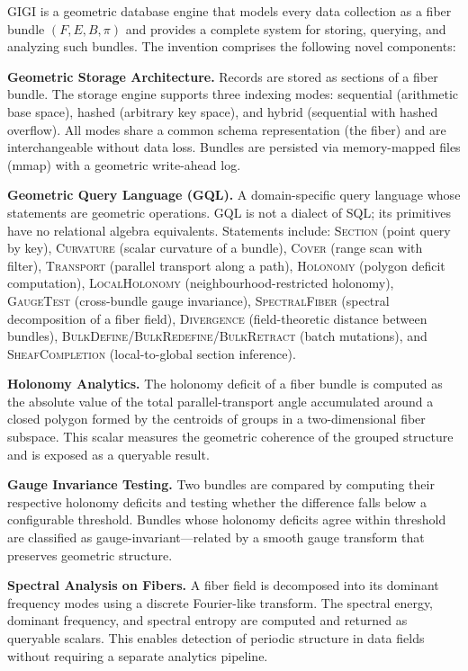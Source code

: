 \documentclass[11pt,letterpaper]{article}
\begin{document}
GIGI is a geometric database engine that models every data collection as a fiber bundle $(F, E, B, \pi)$ and provides a complete system for storing, querying, and analyzing such bundles. The invention comprises the following novel components:

\textbf{Geometric Storage Architecture.} Records are stored as sections of a fiber bundle. The storage engine supports three indexing modes: sequential (arithmetic base space), hashed (arbitrary key space), and hybrid (sequential with hashed overflow). All modes share a common schema representation (the fiber) and are interchangeable without data loss. Bundles are persisted via memory-mapped files (mmap) with a geometric write-ahead log.

\textbf{Geometric Query Language (GQL).} A domain-specific query language whose statements are geometric operations. GQL is not a dialect of SQL; its primitives have no relational algebra equivalents. Statements include: \textsc{Section} (point query by key), \textsc{Curvature} (scalar curvature of a bundle), \textsc{Cover} (range scan with filter), \textsc{Transport} (parallel transport along a path), \textsc{Holonomy} (polygon deficit computation), \textsc{LocalHolonomy} (neighbourhood-restricted holonomy), \textsc{GaugeTest} (cross-bundle gauge invariance), \textsc{SpectralFiber} (spectral decomposition of a fiber field), \textsc{Divergence} (field-theoretic distance between bundles), \textsc{BulkDefine}/\allowbreak\textsc{BulkRedefine}/\allowbreak\textsc{BulkRetract} (batch mutations), and \textsc{SheafCompletion} (local-to-global section inference).

\textbf{Holonomy Analytics.} The holonomy deficit of a fiber bundle is computed as the absolute value of the total parallel-transport angle accumulated around a closed polygon formed by the centroids of groups in a two-dimensional fiber subspace. This scalar measures the geometric coherence of the grouped structure and is exposed as a queryable result.

\textbf{Gauge Invariance Testing.} Two bundles are compared by computing their respective holonomy deficits and testing whether the difference falls below a configurable threshold. Bundles whose holonomy deficits agree within threshold are classified as gauge-invariant---related by a smooth gauge transform that preserves geometric structure.

\textbf{Spectral Analysis on Fibers.} A fiber field is decomposed into its dominant frequency modes using a discrete Fourier-like transform. The spectral energy, dominant frequency, and spectral entropy are computed and returned as queryable scalars. This enables detection of periodic structure in data fields without requiring a separate analytics pipeline.
\end{document}
